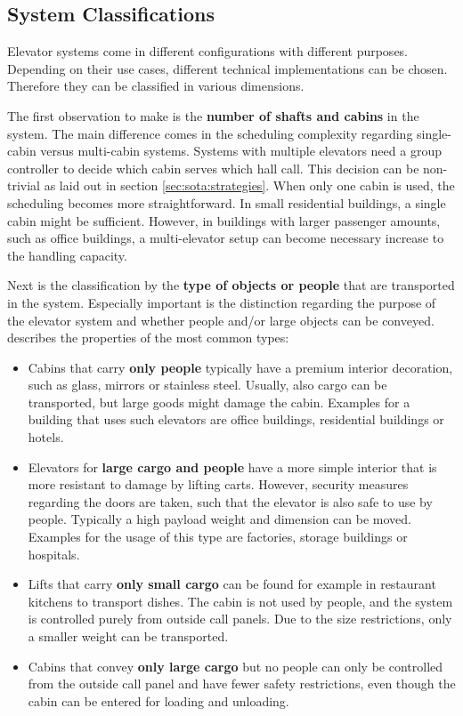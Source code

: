 \subsection{System Classifications}

Elevator systems come in different configurations with different purposes.
Depending on their use cases, different technical implementations can be chosen.
Therefore they can be classified in various dimensions.

The first observation to make is the \textbf{number of shafts and cabins} in the system.
The main difference comes in the scheduling complexity regarding single-cabin versus multi-cabin systems.
Systems with multiple elevators need a group controller to decide which cabin serves which hall call.
This decision can be non-trivial as laid out in section \vref{sec:sota:strategies}.
When only one cabin is used, the scheduling becomes more straightforward.
In small residential buildings, a single cabin might be sufficient.
However, in buildings with larger passenger amounts, such as office buildings, a multi-elevator setup can become necessary increase to the handling capacity.

Next is the classification by the \textbf{type of objects or people} that are transported in the system. Especially important is the distinction regarding the purpose of the elevator system and whether people and/or large objects can be conveyed.
\textcite[][pp.~141--158]{unger2015aufzuege} describes the properties of the most common types:

\begin{itemize}
    \item Cabins that carry \textbf{only people} 
    typically have a premium interior decoration, such as glass, mirrors or stainless steel.
    Usually, also cargo can be transported, but large goods might damage the cabin.
    Examples for a building that uses such elevators are office buildings, residential buildings or hotels.
    
    \item Elevators for \textbf{large cargo and people} 
    have a more simple interior that is more resistant to damage by lifting carts. 
    However, security measures regarding the doors are taken, such that the elevator is also safe to use by people. 
    Typically a high payload weight and dimension can be moved.
    Examples for the usage of this type are factories, storage buildings or hospitals. 
    
    \item Lifts that carry \textbf{only small cargo} can be found for example in restaurant kitchens to transport dishes.
    The cabin is not used by people, and the system is controlled purely from outside call panels. 
    Due to the size restrictions, only a smaller weight can be transported.
    
    \item Cabins that convey \textbf{only large cargo} but no people can only be controlled from the outside call panel and have fewer safety restrictions, even though the cabin can be entered for loading and unloading. 
\end{itemize}

